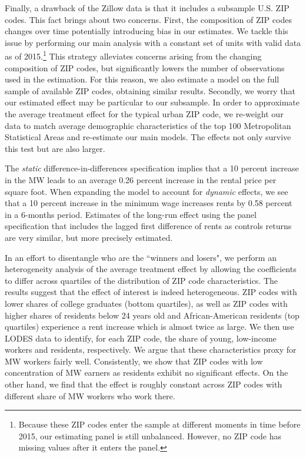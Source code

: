 Finally, a drawback of the Zillow data is that it includes a subsample U.S. ZIP codes. 
This fact brings about two concerns.
First, the composition of ZIP codes changes over time potentially introducing bias in our 
estimates. We tackle this issue by performing our main analysis with a constant set of 
units with valid data as of 2015.\footnote{Because these ZIP codes enter the sample at 
	different moments in time before 2015, our estimating panel is still unbalanced. 
	However, no ZIP code has missing values after it enters the panel.}
This strategy alleviates concerns arising from the changing composition of ZIP codes, but 
significantly lowers the number of observations used in the estimation. For this reason, 
we also estimate a model on the full sample of available ZIP codes, obtaining similar 
results.
Secondly, we worry that our estimated effect may be particular to our subsample. In order 
to approximate the average treatment effect for the typical urban ZIP code, we re-weight 
our data to match average demographic characteristics of the top 100 Metropolitan 
Statistical Areas and re-estimate our main models. The effects not only survive this test 
but are also larger.

The \textit{static} difference-in-differences specification implies that a 10 percent 
increase in the MW leads to an average 0.26 percent increase in the rental price per 
square foot.
When expanding the model to account for \textit{dynamic} effects, we see that a 10 
percent increase in the minimum wage increases rents by 0.58 percent in a 6-months period.
Estimates of the long-run effect using the panel specification that includes the lagged 
first difference of rents as controls returns are very similar, but more precisely 
estimated.

In an effort to disentangle who are the ``winners and losers", we perform an 
heterogeneity analysis of the average treatment effect by allowing the coefficients to 
differ across quartiles of the distribution of ZIP code characteristics.
The results suggest that the effect of interest is indeed heterogeneous.
ZIP codes with lower shares of college graduates (bottom quartiles), as well as 
ZIP codes with higher shares of residents below 24 years old and African-American 
residents (top quartiles) experience a rent increase which is almost twice as large.
We then use LODES data to identify, for each ZIP code, the share of young, low-income 
workers and residents, respectively.
We argue that these characteristics proxy for MW workers fairly well.
Consistently, we show that ZIP codes with low concentration of MW earners as residents 
exhibit no significant effects.
On the other hand, we find that the effect is roughly constant across ZIP codes with 
different share of MW workers who work there.

